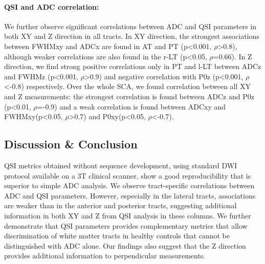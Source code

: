 \begin{figure}
  \centering
  \label{fig:experiment3_tractplots}
\end{figure} 

\begin{figure}
  \centering
  \label{fig:experiment3_singlesubjectDPDF}
\end{figure}

\paragraph{QSI and ADC correlation:} We further observe significant correlations between ADC and QSI parameters in both XY and Z direction in all tracts. In XY direction, the strongest associations between FWHMxy and ADCx are found in AT and PT (p<0.001, $\rho$>0.8), although weaker correlations are also found in the r-LT (p<0.05, $\rho$=0.66). In Z direction, we find strong positive correlations only in PT and l-LT between ADCz and FWHMz (p<0.001, $\rho$>0.9) and negative correlation with P0z (p<0.001, $\rho$<-0.8) respectively. Over the whole SCA, we found correlation between all XY and Z measurements: the strongest correlation is found between ADCz and P0z (p<0.01, $\rho$=-0.9) and a weak correlation is found between ADCxy and FWHMxy(p<0.05, $\rho$>0.7) and P0xy(p<0.05, $\rho$<-0.7). 
\subsection*{Discussion \& Conclusion} QSI metrics obtained without sequence development, using standard DWI protocol available on a 3T clinical scanner, show a good reproducibility that is superior to simple ADC analysis. We observe tract-specific correlations between ADC and QSI parameters. However, especially in the lateral tracts, associations are weaker than in the anterior and posterior tracts, suggesting additional information in both XY and Z from QSI analysis in these columns. We further demonstrate that QSI parameters provides complementary metrics that allow discrimination of white matter tracts in healthy controls that cannot be distinguished with ADC alone. Our findings also suggest that the Z direction provides additional information to perpendicular measurements.
